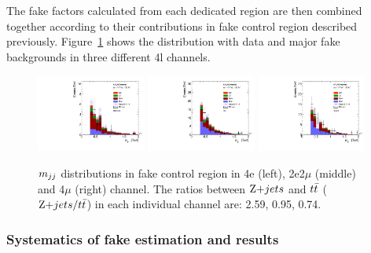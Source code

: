 The fake factors calculated from each dedicated region are then combined together according to their contributions in fake control region described previously.
Figure~\ref{fig:fake_mjj} shows the \mjj distribution with data and major fake backgrounds in three different 4l channels.
\begin{figure}[!htb]
  \centering
  \includegraphics[width=0.32\textwidth]{figures/VBSZZ/fakebkg/15161718_mva_dijet_mass_zjet_ttbar_ratio_electrons_mva_dijet_mass.pdf}
  \includegraphics[width=0.32\textwidth]{figures/VBSZZ/fakebkg/15161718_mva_dijet_mass_zjet_ttbar_ratio_mix_mva_dijet_mass.pdf}
  \includegraphics[width=0.32\textwidth]{figures/VBSZZ/fakebkg/15161718_mva_dijet_mass_zjet_ttbar_ratio_muons_mva_dijet_mass.pdf}
  \caption{$m_{jj}$ distributions in fake control region in 4e (left), 2e2$\mu$ (middle) and 4$\mu$ (right) channel.
The ratios between $\Zjet$ and $t\bar{t}$ ($\Zjet / \ttbar$) in each individual channel are: 2.59, 0.95, 0.74.}
  \label{fig:fake_mjj}
\end{figure}

\subsubsection{Systematics of fake estimation and results}
\label{sec:fake_syst}

